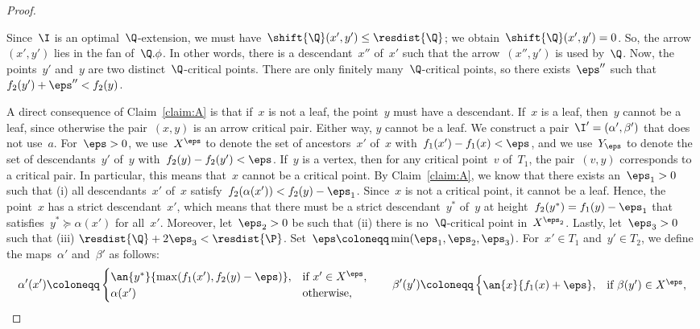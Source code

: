 \begin{proof}
\begin{claimproof}
    Since~$\I$ is an optimal~$\Q$-extension, we must have~$\shift{\Q}(x', y') \le \resdist{\Q}$; we obtain~$\shift{\Q}(x', y') = 0$.
    So, the arrow~$(x', y')$ lies in the fan of~$\Q.\phi$.
    In other words, there is a descendant~$x''$ of~$x'$ such that the arrow~$(x'', y')$ is used by~$\Q$.
    Now, the points~$y'$ and~$y$ are two distinct~$\Q$-critical points.
    There are only finitely many~$\Q$-critical points, so there exists~$\eps''$ such that~$f_2(y') + \eps'' < f_2(y)$.
    \end{claimproof}
%
    \noindent
    A direct consequence of Claim~\ref{claim:A} is that if~$x$ is not a leaf, the point~$y$ must have a descendant.
    If~$x$ is a leaf, then~$y$ cannot be a leaf, since otherwise the pair~$(x, y)$ is an arrow critical pair.
    Either way, $y$ cannot be a leaf.
    We construct a pair~$\I' = (\alpha', \beta')$ that does not use~$a$.
    For~$\eps > 0$, we use~$X^\eps$ to denote the set of ancestors~$x'$ of~$x$ with~$f_1(x') - f_1(x) < \eps$, and we use~$Y_\eps$ to denote the set of descendants~$y'$ of~$y$ with~$f_2(y) - f_2(y') < \eps$.
%
    If~$y$ is a vertex, then for any critical point~$v$ of~$T_1$, the pair~$(v, y)$ corresponds to a critical pair.
    In particular, this means that~$x$ cannot be a critical point.
    By Claim~\ref{claim:A}, we know that there exists an~$\eps_1 > 0$ such that (i) all descendants~$x'$ of~$x$ satisfy~$f_2(\alpha(x')) < f_2(y) - \eps_1$.
    Since~$x$ is not a critical point, it cannot be a leaf.
    Hence, the point~$x$ has a strict descendant~$x'$, which means that there must be a strict descendant~$y^*$ of~$y$ at height~$f_2(y^*) = f_1(y) - \eps_1$ that satisfies~$y^* \succeq \alpha(x')$ for all~$x'$.
    Moreover, let~$\eps_2 > 0$ be such that (ii) there is no~$\Q$-critical point in~$X^{\eps_2}$.
    Lastly, let~$\eps_3 > 0$ such that (iii) $\resdist{\Q} + 2\eps_3 < \resdist{\P}$.
    Set~$\eps \coloneqq \min(\eps_1, \eps_2, \eps_3)$.
    For~$x' \in T_1$ and~$y' \in T_2$, we define the maps~$\alpha'$ and~$\beta'$ as follows:
    \[
        \alpha'(x') \coloneqq \begin{cases}
            \an{y^*}{\max(f_1(x'), f_2(y)-\eps)}, & \text{if } x' \in X^\eps, \\
            \alpha(x') & \text{otherwise,}
        \end{cases} \qquad
        \beta'(y') \coloneqq \begin{cases}
            \an{x}{f_1(x) + \eps}, & \text{if } \beta(y') \in X^\eps, \\

\end{cases}\]
\end{proof}
